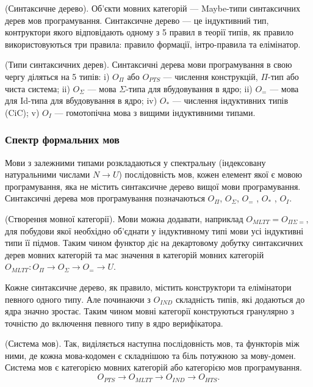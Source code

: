 \begin{definition} (Синтаксичне дерево).
Об'єкти мовних категорій --- Maybe-типи синтаксичних дерев мов програмування.
Синтаксичне дерево --- це індуктивний тип, контруктори якого відповідають
одному з 5 правил в теорії типів, як правило використовуються три правила:
правило формації, інтро-правила та елімінатор.

\begin{definition} (Типи синтаксичних дерев).
Синтаксичні дерева мови програмування в свою чергу діляться на 5 типів:
i) $O_\Pi$ або $O_{PTS}$ --- числення конструкцій, $\Pi$-тип або чиста система;
ii) $O_\Sigma$ --- мова $\Sigma$-типа для вбудовування в ядро;
ii) $O_{=}$ --- мова для Id-типа для вбудовування в ядро;
iv) $O_{*}$ --- числення індуктивних типів (CiC);
v) $O_{I}$ --- гомотопічна мова з вищими індуктивними типами.
\end{definition}

\subsubsection*{Спектр формальних мов}

Мови з залежними типами розкладаються у
спектральну (індексовану натуральними числами $N \rightarrow U$)
послідовність  мов, кожен елемент якої є мовою програмування,
яка не містить синтаксичне дерево вищої мови програмування.
Синтаксичні дерева мов програмування позначаються $O_\Pi$,
$O_\Sigma$, $O_{=}$ , $O_{*}$ , $O_{I}$.

\begin{definition} (Створення мовної категорії).
Мови можна додавати, наприклад $O_{MLTT} = O_{\Pi\Sigma=}$, для побудови якої необхідно
об'єднати у індуктивному типі мови усі індуктивні типи її підмов.
Таким чином функтор діє на декартовому добутку синтаксичних дерев мовних категорій
та має значення в категорій мовних категорій
$O_{MLTT} : O_\Pi \rightarrow O_\Sigma \rightarrow O_= \rightarrow U$.
\end{definition}

Кожне синтаксичне дерево, як правило, містить конструктори
та елімінатори певного одного типу. Але починаючи з $O_{IND}$
складність типів, які додаються до ядра значно зростає.
Таким чином мовні категорії конструються гранулярно з
точністю до включення певного типу в ядро верифікатора.

\begin{definition} (Система мов).
Так, виділяється наступна послідовність мов, та функторів між ними,
де кожна мова-кодомен є складнішою та біль потужною за мову-домен.
Система мов є категорією мовних категорій або категорією мов програмування.
$$
O_{PTS} \rightarrow O_{MLTT} \rightarrow O_{IND} \rightarrow O_{HTS}.
$$
\end{definition}


\end{definition}

